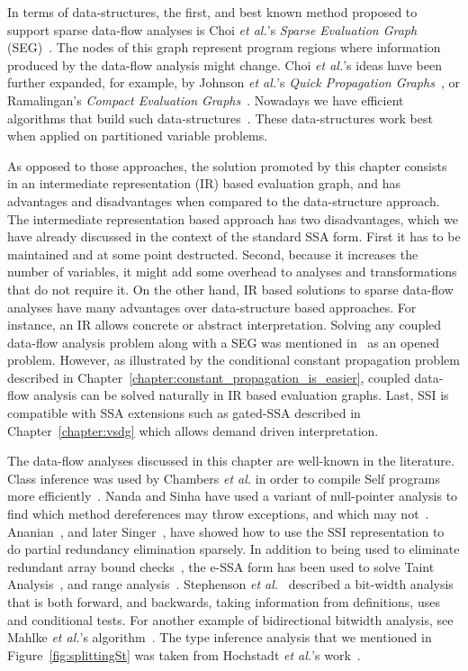 In terms of data-structures, the first, and best known method proposed to support sparse data-flow analyses is Choi {\em et al.}'s {\em Sparse Evaluation Graph} (SEG)~\cite{Choi91}.
The nodes of this graph represent program regions where information produced by the data-flow analysis might change.
Choi {\em et al.}'s ideas have been further expanded, for example, by Johnson {\em et al.}'s {\em Quick Propagation Graphs}~\cite{Johnson93}, or Ramalingan's {\em Compact Evaluation Graphs}~\cite{Ramalingan02}.
Nowadays we have efficient algorithms that build such data-structures~\cite{Pingali95,Pingali97,Johnson94}.
These data-structures work best when applied on partitioned variable problems.

As opposed to those approaches, the solution promoted by this chapter consists in an intermediate representation (IR) based evaluation graph, and has advantages and disadvantages when compared to the data-structure approach.
The intermediate representation based approach has two disadvantages, which we have already discussed in the context of the standard SSA form.
First it has to be maintained and at some point destructed.
Second, because it increases the number of variables, it might add some overhead to analyses and transformations that do not require it.
On the other hand, IR based solutions to sparse data-flow analyses have many advantages over data-structure based approaches.
For instance, an IR allows concrete or abstract interpretation.
Solving any coupled data-flow analysis problem along with a SEG was mentioned in~\cite{Choi91} as an opened problem.
However, as illustrated by the conditional constant propagation problem described in Chapter~\ref{chapter:constant_propagation_is_easier}, coupled data-flow analysis can be solved naturally in IR based evaluation graphs.
Last, SSI is compatible with SSA extensions such as gated-SSA described in Chapter~\ref{chapter:vsdg} which allows demand driven interpretation.

The data-flow analyses discussed in this chapter are well-known in the literature.
Class inference was used by Chambers {\em et al.} in order to compile Self programs more efficiently~\cite{Chambers89}.
Nanda and Sinha have used a variant of null-pointer analysis to find which method dereferences may throw exceptions, and which may not~\cite{Nanda09}.
Ananian~\cite{Ananian99}, and later Singer~\cite{Singer06}, have showed how to use the SSI representation to do partial redundancy elimination sparsely.
In addition to being used to eliminate redundant array bound checks~\cite{Bodik00}, the e-SSA form has been used to solve Taint Analysis~\cite{Rimsa11}, and range analysis~\cite{Su05,Gawlitza09}.
Stephenson {\em et al.}~\cite{Stephenson00} described a bit-width analysis that is both forward, and backwards, taking information from definitions, uses and conditional tests.
For another example of bidirectional bitwidth analysis, see Mahlke {\em et al.}'s algorithm~\cite{Mahlke01}.
The type inference analysis that we mentioned in Figure~\ref{fig:splittingSt} was taken from Hochstadt {\em et al.}'s work~\cite{Hochstadt08}.

